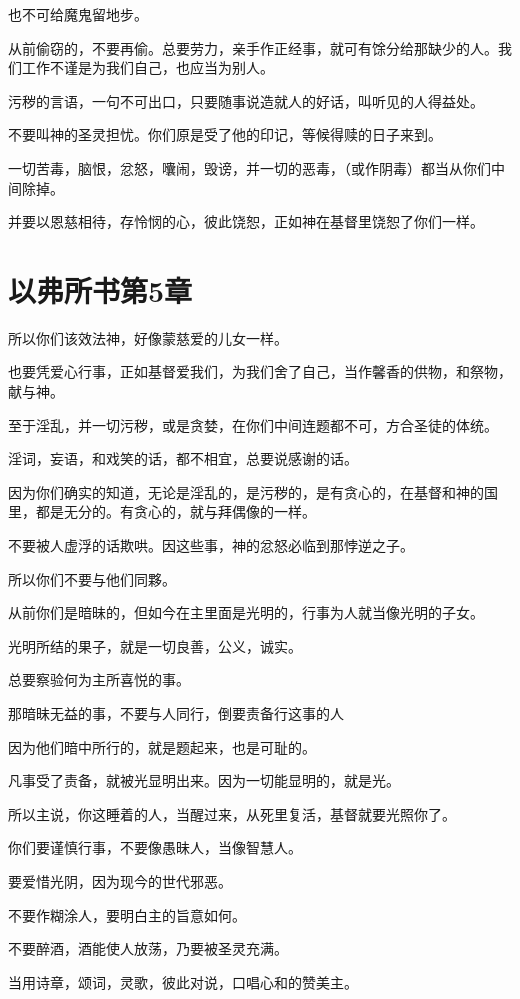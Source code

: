 \documentclass[12pt,oneside]{book}
\begin{document}
也不可给魔鬼留地步。

从前偷窃的，不要再偷。总要劳力，亲手作正经事，就可有馀分给那缺少的人。我们工作不谨是为我们自己，也应当为别人。

污秽的言语，一句不可出口，只要随事说造就人的好话，叫听见的人得益处。

不要叫神的圣灵担忧。你们原是受了他的印记，等候得赎的日子来到。

一切苦毒，脑恨，忿怒，囔闹，毁谤，并一切的恶毒，（或作阴毒）都当从你们中间除掉。

并要以恩慈相待，存怜悯的心，彼此饶恕，正如神在基督里饶恕了你们一样。

\chapter{以弗所书第5章}
所以你们该效法神，好像蒙慈爱的儿女一样。

也要凭爱心行事，正如基督爱我们，为我们舍了自己，当作馨香的供物，和祭物，献与神。

至于淫乱，并一切污秽，或是贪婪，在你们中间连题都不可，方合圣徒的体统。

淫词，妄语，和戏笑的话，都不相宜，总要说感谢的话。

因为你们确实的知道，无论是淫乱的，是污秽的，是有贪心的，在基督和神的国里，都是无分的。有贪心的，就与拜偶像的一样。

不要被人虚浮的话欺哄。因这些事，神的忿怒必临到那悖逆之子。

所以你们不要与他们同夥。

从前你们是暗昧的，但如今在主里面是光明的，行事为人就当像光明的子女。

光明所结的果子，就是一切良善，公义，诚实。

总要察验何为主所喜悦的事。

那暗昧无益的事，不要与人同行，倒要责备行这事的人

因为他们暗中所行的，就是题起来，也是可耻的。

凡事受了责备，就被光显明出来。因为一切能显明的，就是光。

所以主说，你这睡着的人，当醒过来，从死里复活，基督就要光照你了。

你们要谨慎行事，不要像愚昧人，当像智慧人。

要爱惜光阴，因为现今的世代邪恶。

不要作糊涂人，要明白主的旨意如何。

不要醉酒，酒能使人放荡，乃要被圣灵充满。

当用诗章，颂词，灵歌，彼此对说，口唱心和的赞美主。
\end{document}
